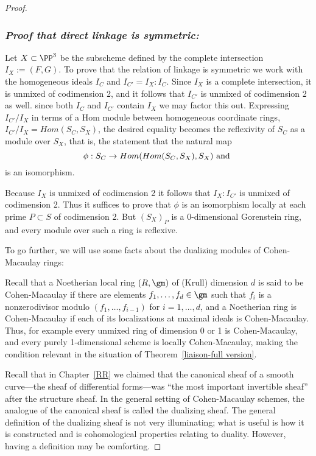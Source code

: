 \begin{proof}
 
\subsubsection{\it Proof that direct linkage is symmetric:}
Let $X\subset \PP^3$ be the subscheme defined by the complete intersection $I_X := (F,G)$.
To prove that the relation of linkage is symmetric we work with
the homogeneous ideals $I_C$ and $I_{C'} = I_X: I_C$. Since $I_X$ is a complete intersection, it is unmixed of codimension 2, and it
follows that $I_{C'}$ is unmixed of codimension 2 as well.
since both $I_C$ and $I_{C'}$ contain $I_X$ we may factor this out. Expressing $I_{C'}/I_X$ in terms of a Hom module between
homogeneous coordinate rings,
$I_{{C'}}/I_X = Hom(S_C, S_X)$,
the desired equality becomes the reflexivity of  $S_C$ as a module over $S_X$, that is, the statement that the natural map
$$
\phi: S_C \to Hom(Hom(S_C, S_X), S_X)\hbox{ and  } 
$$
is an isomorphism.

Because $I_X$ is unmixed of codimension 2 it follows that $I_X:I_{{C'}}$ is unmixed
of codimension 2. Thus it suffices to prove that $\phi$ is an isomorphism locally at each prime $P\subset S$ of codimension 2.
But $(S_X)_P$ is a 0-dimensional Gorenstein ring, and every module over such a ring is reflexive.

To go further, we will use some facts about the dualizing modules of Cohen-Macaulay rings:

Recall that a Noetherian local ring $(R,\gm)$ of (Krull) dimension $d$ is said to be Cohen-Macaulay if there are elements $f_1,\dots,f_d\in \gm$ such that
$f_i$ is a nonzerodivisor modulo $(f_1,\dots,f_{i-1})$ for $i =1,\dots,d$, and a Noetherian ring is Cohen-Macaulay if each of its localizations at maximal ideals
is Cohen-Macaulay. Thus, for example every unmixed ring of dimension 0 or 1 is Cohen-Macaulay, and every purely 1-dimensional scheme is locally Cohen-Macaulay,
making the condition relevant in the situation of Theorem~\ref{liaison-full version}. 

Recall that in Chapter~\ref{RR} we claimed that the canonical sheaf of a smooth curve---the sheaf of differential forms---was ``the most important invertible sheaf'' after the structure sheaf. In the general setting of Cohen-Macaulay schemes, the analogue of the canonical sheaf is called the dualizing sheaf.
The general definition of the dualizing sheaf is not very illuminating; what is useful is how it is constructed and is cohomological properties relating to duality.
However, having a definition may be comforting. 


\end{proof}
